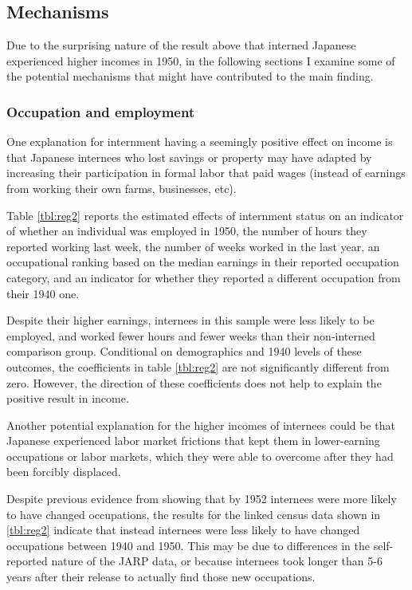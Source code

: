 \documentclass[12pt]{article}
\begin{document}
\subsection{Mechanisms}
\label{sec:org41c5015}

Due to the surprising nature of the result above
that interned Japanese experienced higher incomes in 1950,
in the following sections I examine some of the potential mechanisms
that might have contributed to the main finding.
\subsubsection{Occupation and employment}
\label{sec:org722a750}

One explanation for internment having a seemingly positive effect on income
is that Japanese internees who lost savings or property may have adapted
by increasing their participation in formal labor that paid wages
(instead of earnings from working their own farms, businesses, etc).

Table \ref{tbl:reg2} reports the estimated effects of internment status
on an indicator of whether an individual was employed in 1950,
the number of hours they reported working last week,
the number of weeks worked in the last year,
an occupational ranking based on the median earnings in their reported occupation category,
and an indicator for whether they reported a different occupation from their 1940 one.



Despite their higher earnings,
internees in this sample were less likely to be employed,
and worked fewer hours and fewer weeks than their non-interned comparison group.
Conditional on demographics and 1940 levels of these outcomes,
the coefficients in table \ref{tbl:reg2} are not significantly different from zero.
However, the direction of these coefficients
does not help to explain the positive result in income.

Another potential explanation for the higher incomes of internees
could be that Japanese experienced labor market frictions
that kept them in lower-earning occupations or labor markets,
which they were able to overcome after they had been
forcibly displaced.

Despite previous evidence from \citet{arellano-boverDisplacementDiversityMobility2022}
showing that by 1952 internees were more likely to have changed occupations,
the results for the linked census data shown in \ref{tbl:reg2}
indicate that instead internees were less likely to have changed occupations
between 1940 and 1950.
This may be due to differences in the self-reported nature of the JARP data,
or because internees took longer than 5-6 years after their release
to actually find those new occupations.
\end{document}
